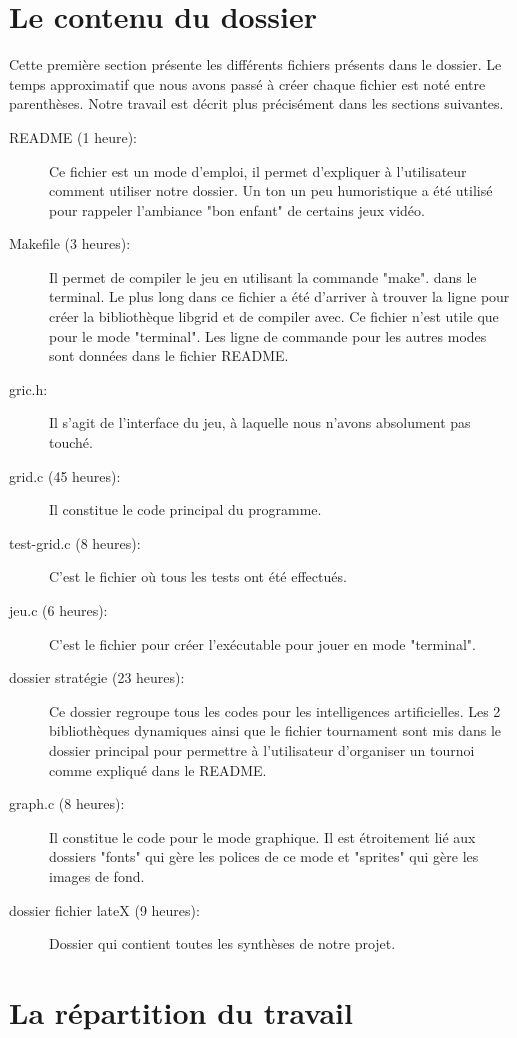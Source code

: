 \documentclass{report}
\begin{document}
\section{Le contenu du dossier}
Cette première section présente les différents fichiers présents dans le dossier. Le temps approximatif que nous avons passé à créer chaque fichier est noté entre parenthèses. Notre travail est décrit plus précisément dans les sections suivantes.\\
\begin{description}
\item [README (1 heure):] Ce fichier est un mode d'emploi, il permet d'expliquer à l'utilisateur comment utiliser notre dossier. Un ton un peu humoristique a été utilisé pour rappeler l'ambiance "bon enfant" de certains jeux vidéo.
\item[Makefile (3 heures):] Il permet de compiler le jeu en utilisant la commande "make". dans le terminal. Le plus long dans ce fichier a été d'arriver à trouver la ligne pour créer la bibliothèque libgrid et de compiler avec. Ce fichier n'est utile que pour le mode "terminal". Les ligne de commande pour les autres modes sont données dans le fichier README.
\item[gric.h:] Il s'agit de l'interface du jeu, à laquelle nous n'avons absolument pas touché.
\item[grid.c (45 heures):] Il constitue le code principal du programme. 
\item[test-grid.c (8 heures):] C'est le fichier où tous les tests ont été effectués.
\item[jeu.c (6 heures):] C'est le fichier pour créer l'exécutable pour jouer en mode "terminal".
\item[dossier stratégie (23 heures):] Ce dossier regroupe tous les codes pour les intelligences artificielles. Les 2 bibliothèques dynamiques ainsi que le fichier tournament sont mis dans le dossier principal pour permettre à l'utilisateur d'organiser un tournoi comme expliqué dans le README.
\item[graph.c (8 heures):] Il constitue le code pour le mode graphique. Il est étroitement lié aux dossiers "fonts" qui gère les polices de ce mode et "sprites" qui gère les images de fond.
\item[dossier fichier lateX (9 heures):] Dossier qui contient toutes les synthèses de notre projet.
\end{description}

\section{La répartition du travail}
\end{document}
